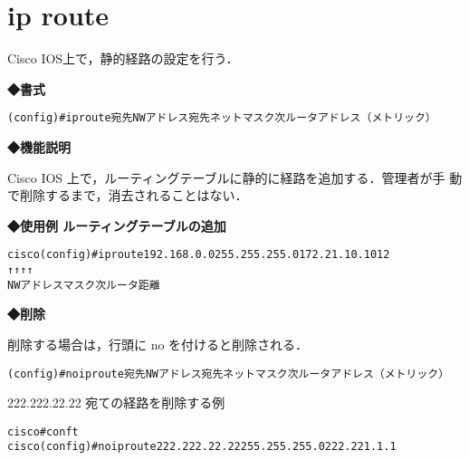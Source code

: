 \section{ip route}
\label{cmd:ios-ip-routeping}
Cisco IOS上で，静的経路の設定を行う．

\noindent
{\bf ◆書式}
\begin{center}
\begin{screen}
\begin{alltt}
 (config)#ip route 宛先NWアドレス 宛先ネットマスク 次ルータアドレス （メトリック）
\end{alltt}
\end{screen}
\end{center}


{\bf ◆機能説明}

Cisco IOS 上で，ルーティングテーブルに静的に経路を追加する．管理者が手
動で削除するまで，消去されることはない．

{\bf ◆使用例    ルーティングテーブルの追加}
\begin{center}
\begin{breakbox}
\begin{alltt}
cisco(config)#ip route 192.168.0.0 255.255.255.0 172.21.10.101 2
                         ↑             ↑           ↑        ↑
                     NWアドレス      マスク     次ルータ      距離
\end{alltt}
\end{breakbox}
\end{center}
                

{\bf ◆削除}

削除する場合は，行頭に no を付けると削除される．

\begin{center}
\begin{screen}
\begin{alltt}
 (config)#no ip route 宛先NWアドレス 宛先ネットマスク 次ルータアドレス （メトリック）
\end{alltt}
\end{screen}
\end{center}

222.222.22.22 宛ての経路を削除する例
　
\begin{center}
\begin{screen}
\begin{alltt}
cisco#conf t
cisco(config)#no ip route 222.222.22.22 255.255.255.0 222.221.1.1
\end{alltt}
\end{screen}
\end{center}